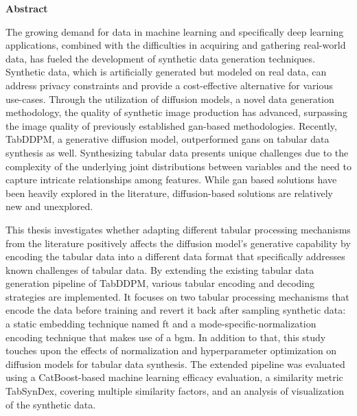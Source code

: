 \thispagestyle{empty}
\begin{center}
	\textbf{\LARGE Abstract}
\end{center}
The growing demand for data in machine learning and specifically deep learning applications, combined with the difficulties in acquiring and gathering real-world data, has fueled the development of synthetic data generation techniques.
Synthetic data, which is artificially generated but modeled on real data, can address privacy constraints and provide a cost-effective alternative for various use-cases.
Through the utilization of diffusion models, a novel data generation methodology, the quality of synthetic image production has advanced, surpassing the image quality of previously established \gls{gan}-based methodologies.
Recently, TabDDPM, a generative diffusion model, outperformed \glspl{gan} on tabular data synthesis as well.
Synthesizing tabular data presents unique challenges due to the complexity of the underlying joint distributions between variables and the need to capture intricate relationships among features.
While \gls{gan} based solutions have been heavily explored in the literature, diffusion-based solutions are relatively new and unexplored.


This thesis investigates whether adapting different tabular processing mechanisms from the literature positively affects the diffusion model's generative capability by encoding the tabular data into a different data format that specifically addresses known challenges of tabular data.
By extending the existing tabular data generation pipeline of TabDDPM, various tabular encoding and decoding strategies are implemented.
It focuses on two tabular processing mechanisms that encode the data before training and revert it back after sampling synthetic data: a static embedding technique named \gls{ft} and a mode-specific-normalization encoding technique that makes use of a \gls{bgm}.
In addition to that, this study touches upon the effects of normalization and hyperparameter optimization on diffusion models for tabular data synthesis.
The extended pipeline was evaluated using a CatBoost-based machine learning efficacy evaluation, a similarity metric TabSynDex, covering multiple similarity factors, and an analysis of visualization of the synthetic data.


